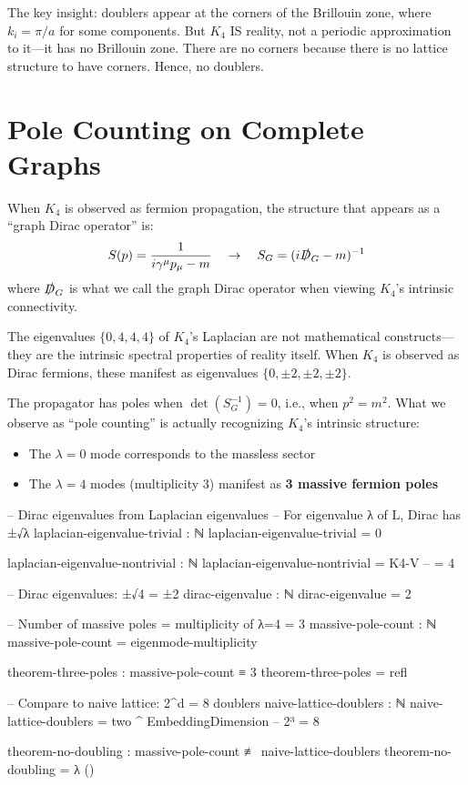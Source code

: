\documentclass[11pt,a4paper]{book}
\begin{document}
The key insight: doublers appear at the corners of the Brillouin zone, where $k_i = \pi/a$ for some components. But $K_4$ IS reality, not a periodic approximation to it—it has no Brillouin zone. There are no corners because there is no lattice structure to have corners. Hence, no doublers.

\section{Pole Counting on Complete Graphs}

When $K_4$ is observed as fermion propagation, the structure that appears as a ``graph Dirac operator'' is:
\[
S(p) = \frac{1}{i\gamma^\mu p_\mu - m} \quad \to \quad S_G = (i\slashed{D}_G - m)^{-1}
\]
where $\slashed{D}_G$ is what we call the graph Dirac operator when viewing $K_4$'s intrinsic connectivity.

The eigenvalues $\{0, 4, 4, 4\}$ of $K_4$'s Laplacian are not mathematical constructs—they are the intrinsic spectral properties of reality itself. When $K_4$ is observed as Dirac fermions, these manifest as eigenvalues $\{0, \pm 2, \pm 2, \pm 2\}$.

The propagator has poles when $\det(S_G^{-1}) = 0$, i.e., when $p^2 = m^2$. What we observe as ``pole counting'' is actually recognizing $K_4$'s intrinsic structure:
\begin{itemize}
\item The $\lambda = 0$ mode corresponds to the massless sector
\item The $\lambda = 4$ modes (multiplicity 3) manifest as \textbf{3 massive fermion poles}
\end{itemize}

\begin{code}
-- Dirac eigenvalues from Laplacian eigenvalues
-- For eigenvalue λ of L, Dirac has ±√λ
laplacian-eigenvalue-trivial : ℕ
laplacian-eigenvalue-trivial = 0

laplacian-eigenvalue-nontrivial : ℕ
laplacian-eigenvalue-nontrivial = K4-V  -- = 4

-- Dirac eigenvalues: ±√4 = ±2
dirac-eigenvalue : ℕ
dirac-eigenvalue = 2

-- Number of massive poles = multiplicity of λ=4 = 3
massive-pole-count : ℕ
massive-pole-count = eigenmode-multiplicity

theorem-three-poles : massive-pole-count ≡ 3
theorem-three-poles = refl

-- Compare to naive lattice: 2^d = 8 doublers
naive-lattice-doublers : ℕ
naive-lattice-doublers = two ^ EmbeddingDimension  -- 2³ = 8

theorem-no-doubling : massive-pole-count ≢ naive-lattice-doublers
theorem-no-doubling = λ ()
\end{code}
\end{document}
